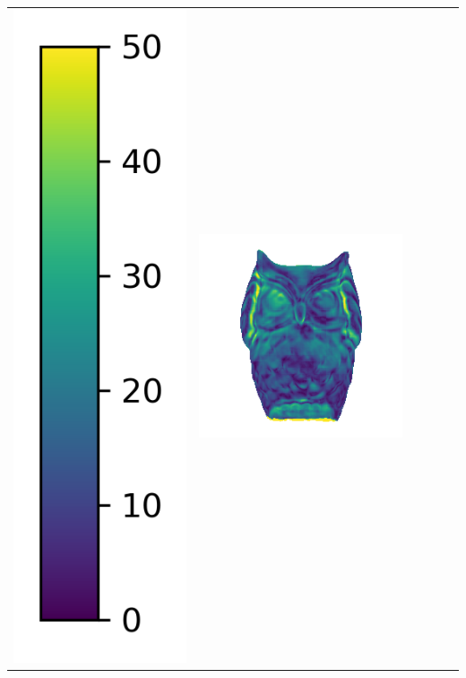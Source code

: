 \begin{tabularx}{\linewidth}{@{}Y@{}Y@{}Y@{}Y@{}Y@{}Y@{}}
\includegraphics[width=0.2\linewidth]{semisynthetic/colorbar_error_vertical.png} &
\includegraphics[width=\linewidth]{semisynthetic/20150514_15_ours_err.png} &

\end{tabularx}
